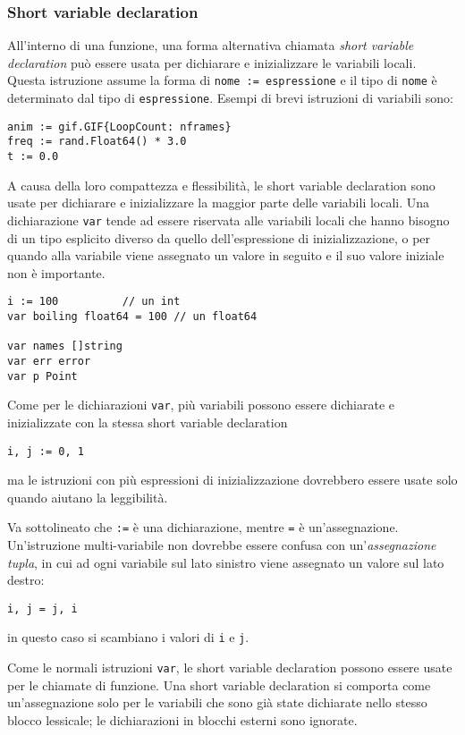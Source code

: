 \documentclass[../../../thesis.tex]{subfiles}
\begin{document}
    \subsubsection{Short variable declaration}
    All'interno di una funzione, una forma alternativa chiamata \textit{short variable declaration} può essere usata per dichiarare e inizializzare le variabili locali.
    Questa istruzione assume la forma di \verb"nome := espressione" e il tipo di \verb"nome" è determinato dal tipo di \verb"espressione".
    Esempi di brevi istruzioni di variabili sono:
    \begin{lstlisting}[frame = single,label={lst:lstlisting1-3-1.1}]
anim := gif.GIF{LoopCount: nframes}
freq := rand.Float64() * 3.0
t := 0.0
    \end{lstlisting}
    A causa della loro compattezza e flessibilità, le short variable declaration sono usate per dichiarare e inizializzare la maggior parte delle variabili locali.
    Una dichiarazione \verb"var" tende ad essere riservata alle variabili locali che hanno bisogno di un tipo esplicito diverso da quello dell'espressione di inizializzazione, o per quando alla variabile viene assegnato un valore in seguito e il suo valore iniziale non è importante.
    \begin{lstlisting}[frame = single,label={lst:lstlisting1-3-1.2}]
i := 100		  // un int
var boiling float64 = 100 // un float64

var names []string
var err error
var p Point
    \end{lstlisting}
    Come per le dichiarazioni \verb"var", più variabili possono essere dichiarate e inizializzate con la stessa short variable declaration
    \begin{lstlisting}[frame = single,label={lst:lstlisting1-3-1.3}]
i, j := 0, 1
    \end{lstlisting}
    ma le istruzioni con più espressioni di inizializzazione dovrebbero essere usate solo quando aiutano la leggibilità.
    \hfill \vspace{12pt}

    Va sottolineato che \verb":=" è una dichiarazione, mentre \verb"=" è un'assegnazione.
    Un'istruzione multi-variabile non dovrebbe essere confusa con un'\textit{assegnazione tupla}, in cui ad ogni variabile sul lato sinistro viene assegnato un valore sul lato destro:
    \begin{lstlisting}[frame = single,label={lst:lstlisting1-3-1.4}]
i, j = j, i
    \end{lstlisting}
    in questo caso si scambiano i valori di \verb"i" e \verb"j".
    \hfill \vspace{12pt}

    Come le normali istruzioni \verb"var", le short variable declaration possono essere usate per le chiamate di funzione.
    Una short variable declaration si comporta come un'assegnazione solo per le variabili che sono già state dichiarate nello stesso blocco lessicale;
    le dichiarazioni in blocchi esterni sono ignorate.
\end{document}
